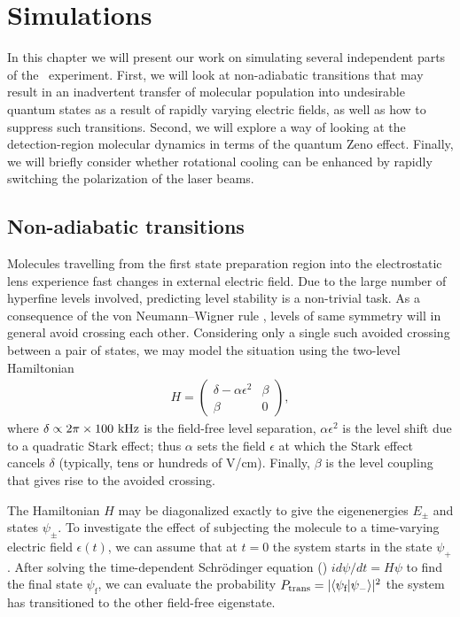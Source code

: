\section{Simulations}

In this chapter we will present our work on simulating several independent parts
of the \CENTREX\ experiment. First, we will look at non-adiabatic transitions
that may result in an inadvertent transfer of molecular population into
undesirable quantum states as a result of rapidly varying electric fields, as
well as how to suppress such transitions. Second, we will explore a way of
looking at the detection-region molecular dynamics in terms of the quantum Zeno
effect. Finally, we will briefly consider whether rotational cooling can be
enhanced by rapidly switching the polarization of the laser beams.

\subsection{Non-adiabatic transitions}
\label{sect:nonadiabatic}

Molecules travelling from the first state preparation region into the
electrostatic lens experience fast changes in external electric field. Due to
the large number of hyperfine levels involved, predicting level stability is a
non-trivial task. As a consequence of the von Neumann--Wigner rule
\cite{mead1979noncrossing}, levels of same symmetry will in general avoid
crossing each other. Considering only a single such avoided crossing between a
pair of states, we may model the situation using the two-level Hamiltonian
%
\begin{align}
    \label{twostate}
    H=\begin{pmatrix}
        \delta-\alpha\epsilon^2&\beta\\
        \beta&0
    \end{pmatrix},
\end{align}
%
where $\delta\propto2\pi\times100~\mathrm{kHz}$ is the field-free level separation,
$\alpha\epsilon^2$ is the level shift due to a quadratic Stark effect; thus
$\alpha$ sets the field $\epsilon$ at which the Stark effect cancels $\delta$
(typically, tens or hundreds of V/cm). Finally, $\beta$ is the level coupling
that gives rise to the avoided crossing.

The Hamiltonian $H$ may be diagonalized exactly to give the eigenenergies
$E_\pm$ and states $\psi_\pm$. To investigate the effect of subjecting the
molecule to a time-varying electric field $\epsilon(t)$, we can assume that at
$t=0$ the system starts in the state $\psi_+$. After solving the time-dependent
Schr\"odinger equation (\TDSE) $id\psi/dt=H\psi$ to find the final state
$\psi_\text{f}$, we can evaluate the probability
$P_\text{trans}=|\langle\psi_\text{f}|\psi_-\rangle|^2$ the system has transitioned
to the other field-free eigenstate.

